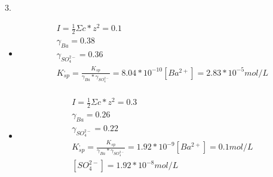 \documentclass{article}
\begin{document}
3.\begin{itemize}
    \item 
    \begin{equation}
        \begin{multlined}
            I = \frac{1}{2}\Sigma c*z^2 = 0.1\\
            \gamma_{Ba} = 0.38\\
            \gamma_{SO_4^{2-}} = 0.36\\
            K^,_{sp} = \frac{K_{sp}}{\gamma_{Ba}*\gamma_{SO_4^{2-}}} = 8.04*10^{-10}
            [Ba^{2+}] = 2.83*10^{-5} mol/L\\
        \end{multlined}
    \end{equation}
    \item
    \begin{equation}
        \begin{multlined}
            I = \frac{1}{2}\Sigma c*z^2 = 0.3\\
            \gamma_{Ba} = 0.26\\
            \gamma_{SO_4^{2-}} = 0.22\\
            K^,_{sp} = \frac{K_{sp}}{\gamma_{Ba}*\gamma_{SO_4^{2-}}} = 1.92*10^{-9}
            [Ba^{2+}] = 0.1 mol/L\\
            [SO_4^{2-}] = 1.92*10^{-8} mol/L\\
        \end{multlined}
    \end{equation}
\end{itemize}
\end{document}
